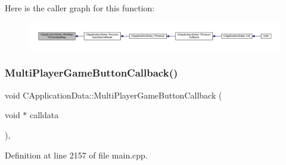 Here is the caller graph for this function\+:\nopagebreak
\begin{figure}[H]
\begin{center}
\leavevmode
\includegraphics[width=350pt]{classCApplicationData_a3dabde94ddec0eb2c732525f54164bc5_icgraph}
\end{center}
\end{figure}
\hypertarget{classCApplicationData_afabb120415cdadf67edca20c67e8c6fa}{}\label{classCApplicationData_afabb120415cdadf67edca20c67e8c6fa} 
\subsubsection{\texorpdfstring{Multi\+Player\+Game\+Button\+Callback()}{MultiPlayerGameButtonCallback()}}
{\footnotesize\ttfamily void C\+Application\+Data\+::\+Multi\+Player\+Game\+Button\+Callback (\begin{DoxyParamCaption}\item[{void $\ast$}]{calldata }\end{DoxyParamCaption})\hspace{0.3cm}{\ttfamily [static]}, {\ttfamily [protected]}}



Definition at line 2157 of file main.\+cpp.


